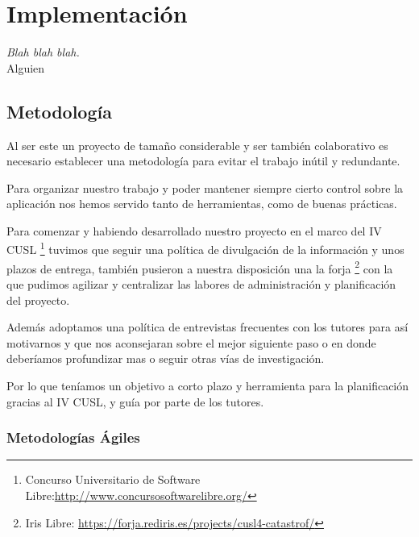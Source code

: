 
\chapter*{Implementación} \label{cap5}


\begin{flushright}
\begin{minipage}{7.85cm}
    {\em Blah blah blah.} \\  Alguien
\end{minipage}
\end{flushright}

\vspace*{5mm}

\section*{Metodología}
Al ser este un proyecto de tamaño considerable y ser también colaborativo es
necesario establecer una metodología para evitar el trabajo inútil y redundante.

Para organizar nuestro trabajo y poder mantener siempre cierto control sobre la
aplicación nos hemos servido tanto de herramientas, como de buenas prácticas.

Para comenzar y habiendo desarrollado nuestro proyecto en el marco del IV CUSL
\footnote{Concurso Universitario de
Software Libre:\url{http://www.concursosoftwarelibre.org/}} tuvimos que seguir
una política de divulgación de la información y unos plazos de entrega, también
pusieron a nuestra disposición una la forja
\footnote{Iris Libre: \url{https://forja.rediris.es/projects/cusl4-catastrof/}}
con la que pudimos agilizar y centralizar las labores de administración y
planificación del proyecto.

Además adoptamos una política de entrevistas frecuentes con los tutores para
así motivarnos y que nos aconsejaran sobre el mejor siguiente paso o en donde
deberíamos profundizar mas o seguir otras vías de investigación.

Por lo que teníamos un objetivo a corto plazo y herramienta para la
planificación gracias al  IV CUSL, y guía por parte de los tutores.

\subsection*{Metodologías Ágiles}

